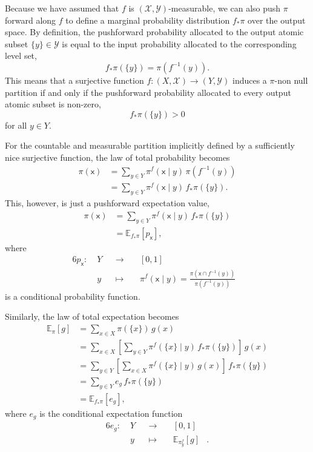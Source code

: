 \documentclass[
  letterpaper,
  DIV=11,
  numbers=noendperiod]{scrartcl}
\begin{document}
Because we have assumed that \(f\) is
\((\mathcal{X}, \mathcal{Y})\)-measurable, we can also push \(\pi\)
forward along \(f\) to define a marginal probability distribution
\(f_{*} \pi\) over the output space. By definition, the pushforward
probability allocated to the output atomic subset
\(\{ y \} \in \mathcal{Y}\) is equal to the input probability allocated
to the corresponding level set, \[
f_{*} \pi( \{ y \} ) = \pi ( f^{-1}(y) ).
\] This means that a surjective function
\(f : (X, \mathcal{X}) \rightarrow (Y, \mathcal{Y})\) induces a
\(\pi\)-non null partition if and only if the pushforward probability
allocated to every output atomic subset is non-zero, \[
f_{*} \pi( \{ y \} ) > 0
\] for all \(y \in Y\).

For the countable and measurable partition implicitly defined by a
sufficiently nice surjective function, the law of total probability
becomes \begin{align*}
\pi( \mathsf{x} )
&=
\sum_{ y \in Y }
\pi^{f}( \mathsf{x} \mid y ) \, \pi(f^{-1}(y))
\\
&=
\sum_{ y \in Y }
\pi^{f}( \mathsf{x} \mid y ) \, f_{*} \pi( \{ y \} ).
\end{align*} This, however, is just a pushforward expectation value,
\begin{align*}
\pi( \mathsf{x} )
&=
\sum_{ y \in Y }
\pi^{f}( \mathsf{x} \mid y ) \, f_{*} \pi( \{ y \} )
\\
&=
\mathbb{E}_{f_{*}\pi} [ p_{\mathsf{x}} ],
\end{align*} where \begin{alignat*}{6}
p_{\mathsf{x}} :\; &Y& &\rightarrow& \; &[0, 1]&
\\
&y& &\mapsto& &\pi^{f}( \mathsf{x} \mid y ) =
\frac{ \pi(\mathsf{x} \cap f^{-1}(y)) }{ \pi(f^{-1}(y)) }&
\end{alignat*} is a conditional probability function.

Similarly, the law of total expectation becomes \begin{align*}
\mathbb{E}_{\pi}[ g ]
&=
\sum_{ x \in X } \pi( \{ x \} ) \, g(x)
\\
&=
\sum_{ x \in X }
\left[ \sum_{ y \in Y }
\pi^{f}( \{ x \} \mid y ) \, f_{*} \pi( \{ y \} )
\right] \, g(x)
\\
&=
\sum_{ y \in Y }
\left[
\sum_{ x \in X }
\pi^{f}( \{ x \} \mid y ) \, g(x)
\right] \, f_{*} \pi( \{ y \} )
\\
&=
\sum_{ y \in Y }
e_{g} \, f_{*} \pi( \{ y \} )
\\
&=
\mathbb{E}_{ f_{*} \pi } [ e_{g} ],
\end{align*} where \(e_{g}\) is the conditional expectation function
\begin{alignat*}{6}
e_{g} :\; &Y& &\rightarrow& \; &[0, 1]&
\\
&y& &\mapsto& & \mathbb{E}_{\pi^{f}_{y} }[ g ] &.
\end{alignat*}
\end{document}
